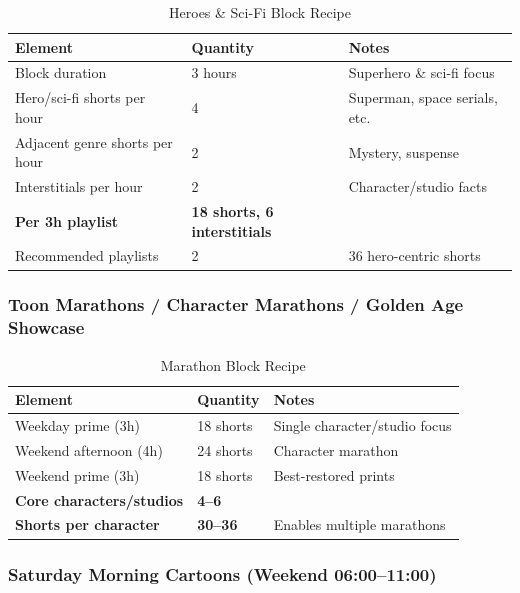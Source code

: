 \documentclass[12pt,letterpaper,twoside]{report}
\begin{document}
\begin{table}[H]
\centering
\caption{Heroes \& Sci-Fi Block Recipe}
\begin{tabular}{@{}L{4cm}L{3cm}L{6cm}@{}}
\toprule
\textbf{Element} & \textbf{Quantity} & \textbf{Notes} \\
\midrule
Block duration & 3 hours & Superhero \& sci-fi focus \\
Hero/sci-fi shorts per hour & 4 & Superman, space serials, etc. \\
Adjacent genre shorts per hour & 2 & Mystery, suspense \\
Interstitials per hour & 2 & Character/studio facts \\
\midrule
\textbf{Per 3h playlist} & \textbf{18 shorts, 6 interstitials} & \\
\midrule
Recommended playlists & 2 & 36 hero-centric shorts \\
\bottomrule
\end{tabular}
\end{table}

\subsubsection{Toon Marathons / Character Marathons / Golden Age Showcase}

\begin{table}[H]
\centering
\caption{Marathon Block Recipe}
\begin{tabular}{@{}L{4cm}L{3cm}L{6cm}@{}}
\toprule
\textbf{Element} & \textbf{Quantity} & \textbf{Notes} \\
\midrule
Weekday prime (3h) & 18 shorts & Single character/studio focus \\
Weekend afternoon (4h) & 24 shorts & Character marathon \\
Weekend prime (3h) & 18 shorts & Best-restored prints \\
\midrule
\textbf{Core characters/studios} & \textbf{4--6} & \\
\textbf{Shorts per character} & \textbf{30--36} & Enables multiple marathons \\
\bottomrule
\end{tabular}
\end{table}

\subsubsection{Saturday Morning Cartoons (Weekend 06:00--11:00)}
\end{document}
